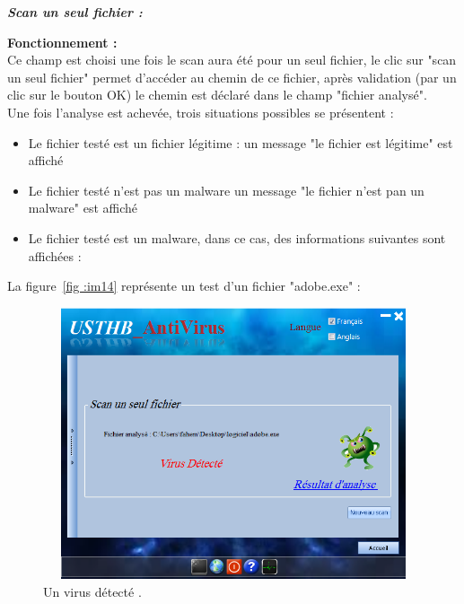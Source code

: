 \textit{\textbf{Scan un seul fichier :}}
\begin{list}{•}{}
\item \textbf{Fonctionnement :}\\
Ce champ est choisi une fois le scan aura été pour un seul fichier, le clic sur "scan un seul fichier"  permet d'accéder au chemin de ce fichier, après validation (par un clic sur le bouton OK) le chemin est déclaré dans le champ "fichier analysé".\\
Une fois l'analyse est achevée, trois situations possibles se présentent :\\
\begin{itemize}
\item Le fichier testé est un fichier légitime : un message "le fichier est légitime" est affiché
\item Le fichier testé n'est pas un malware un message "le fichier n'est pan un malware" est affiché
\item Le fichier testé est un malware, dans ce cas, des informations suivantes sont affichées :
\end{itemize}

La figure~\ref{fig :im14} représente un test d'un fichier "adobe.exe" : \\
\begin{figure}[H]
\begin{center}
\includegraphics[width=13cm, height=8cm]{Figures/ant14.png}
\caption{Un virus détecté .}
\label{fig :ant6} 
\end{center}
\end{figure}
  

\end{list}
